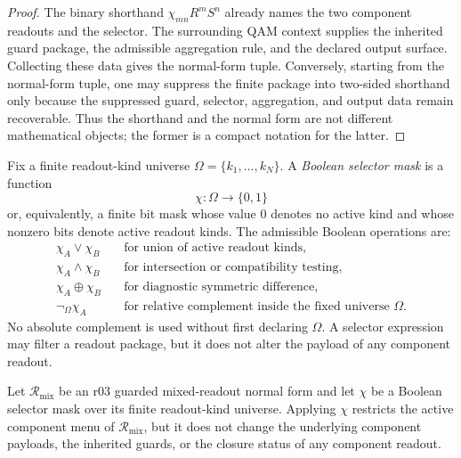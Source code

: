 \begin{proof}
The binary shorthand \(\chi_{mn}R^mS^n\) already names the two component readouts and the selector.  The surrounding QAM context supplies the inherited guard package, the admissible aggregation rule, and the declared output surface.  Collecting these data gives the normal-form tuple.  Conversely, starting from the normal-form tuple, one may suppress the finite package into two-sided shorthand only because the suppressed guard, selector, aggregation, and output data remain recoverable.  Thus the shorthand and the normal form are not different mathematical objects; the former is a compact notation for the latter.
\end{proof}

\begin{definition}\label{def:r03-boolean-selector-mask-grammar}
Fix a finite readout-kind universe \(\Omega=\{k_1,\dots,k_N\}\).  A \emph{Boolean selector mask} is a function
\[
\chi:\Omega\longrightarrow\{0,1\}
\]
or, equivalently, a finite bit mask whose value 0 denotes no active kind and whose nonzero bits denote active readout kinds.  The admissible Boolean operations are:
\begin{align*}
\chi_A\vee\chi_B &\quad\text{for union of active readout kinds,}\\
\chi_A\wedge\chi_B &\quad\text{for intersection or compatibility testing,}\\
\chi_A\oplus\chi_B &\quad\text{for diagnostic symmetric difference,}\\
\neg_{\Omega}\chi_A &\quad\text{for relative complement inside the fixed universe }\Omega.
\end{align*}
No absolute complement is used without first declaring \(\Omega\).  A selector expression may filter a readout package, but it does not alter the payload of any component readout.
\end{definition}

\begin{proposition}\label{prop:r03-mask-filter-conservativity}
Let \(\mathcal R_{\mathrm{mix}}\) be an r03 guarded mixed-readout normal form and let \(\chi\) be a Boolean selector mask over its finite readout-kind universe.  Applying \(\chi\) restricts the active component menu of \(\mathcal R_{\mathrm{mix}}\), but it does not change the underlying component payloads, the inherited guards, or the closure status of any component readout.
\end{proposition}

